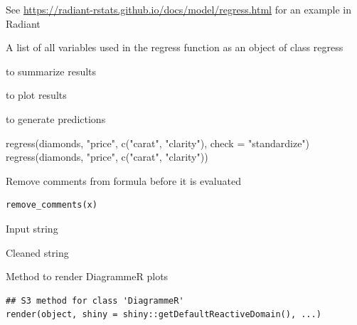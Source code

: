 \documentclass[a4paper]{book}
\begin{document}
%
\begin{Details}
See \url{https://radiant-rstats.github.io/docs/model/regress.html} for an example in Radiant
\end{Details}
%
\begin{Value}
A list of all variables used in the regress function as an object of class regress
\end{Value}
%
\begin{SeeAlso}
 to summarize results

 to plot results

 to generate predictions
\end{SeeAlso}
%
\begin{Examples}
\begin{ExampleCode}
regress(diamonds, "price", c("carat", "clarity"), check = "standardize") %
regress(diamonds, "price", c("carat", "clarity")) %

\end{ExampleCode}
\end{Examples}
%
\begin{Description}
Remove comments from formula before it is evaluated
\end{Description}
%
\begin{Usage}
\begin{verbatim}
remove_comments(x)
\end{verbatim}
\end{Usage}
%
\begin{Arguments}
\begin{ldescription}
\item[\code{x}] Input string
\end{ldescription}
\end{Arguments}
%
\begin{Value}
Cleaned string
\end{Value}
%
\begin{Description}
Method to render DiagrammeR plots
\end{Description}
%
\begin{Usage}
\begin{verbatim}
## S3 method for class 'DiagrammeR'
render(object, shiny = shiny::getDefaultReactiveDomain(), ...)
\end{verbatim}
\end{Usage}
\end{document}
